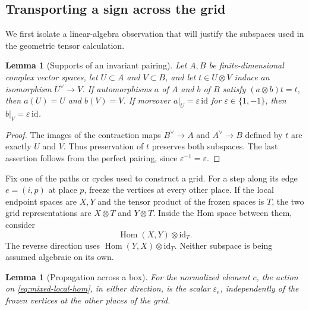\documentclass[11pt]{article}
\numberwithin{equation}{section}
\newtheorem{lemma}[theorem]{Lemma}
\theoremstyle{definition}
\theoremstyle{remark}
\begin{document}
\subsection{Transporting a sign across the grid}

We first isolate a linear-algebra observation that will justify the
subspaces used in the geometric tensor calculation.

\begin{lemma}[Supports of an invariant pairing]\label{lem:mixed-support}
Let $A,B$ be finite-dimensional complex vector spaces, let
$U\subset A$ and $V\subset B$, and let $t\in U\otimes V$ induce
an isomorphism $U^\vee\to V$.  If automorphisms $a$ of $A$ and
$b$ of $B$ satisfy $(a\otimes b)t=t$, then $a(U)=U$ and $b(V)=V$.
If moreover $a|_U=\varepsilon\,\mathrm{id}$ for
$\varepsilon\in\{1,-1\}$, then
$b|_V=\varepsilon\,\mathrm{id}$.
\end{lemma}

\begin{proof}
The images of the contraction maps $B^\vee\to A$ and
$A^\vee\to B$ defined by $t$ are exactly $U$ and $V$.
Thus preservation of $t$ preserves both subspaces.  The last
assertion follows from the perfect pairing, since
$\varepsilon^{-1}=\varepsilon$.
\end{proof}

Fix one of the paths or cycles used to construct a grid.  For a step
along its edge $e=(i,p)$ at place $p$, freeze the vertices at every
other place.  If the local endpoint spaces are $X,Y$ and the tensor
product of the frozen spaces is $T$, the two grid representations are
$X\otimes T$ and $Y\otimes T$.  Inside the Hom space between them,
consider
\begin{equation}\label{eq:mixed-local-hom}
 \operatorname{Hom}(X,Y)\otimes\mathrm{id}_T.
\end{equation}
The reverse direction uses $\operatorname{Hom}(Y,X)\otimes\mathrm{id}_T$.
Neither subspace is being assumed algebraic on its own.

\begin{lemma}[Propagation across a box]\label{lem:mixed-propagation}
For the normalized element $c$, the action on
\eqref{eq:mixed-local-hom}, in either direction, is the scalar
$\varepsilon_e$, independently of the frozen vertices at the
other places of the grid.
\end{lemma}
\end{document}
